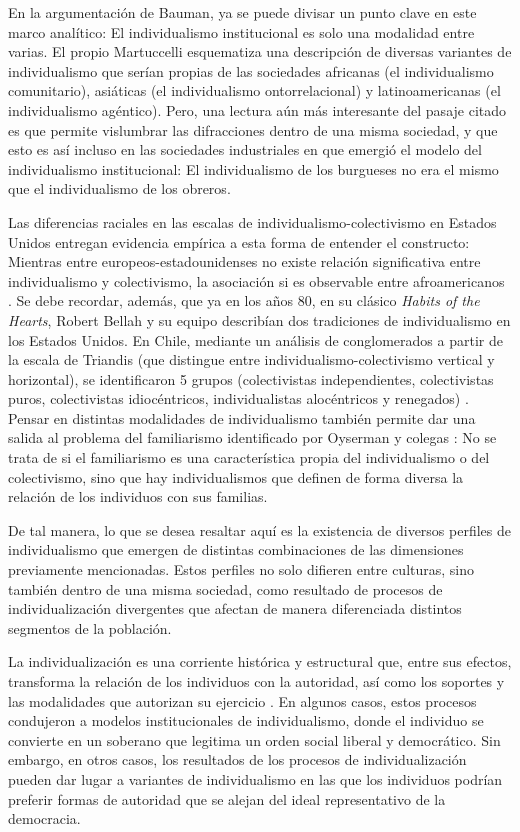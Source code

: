 \documentclass[12pt,twoside]{templates/facsothesis}
\begin{document}
En la argumentación de Bauman, ya se puede divisar un punto clave en este marco analítico: El individualismo institucional es solo una modalidad entre varias. El propio Martuccelli \citeyearpar{martuccelli2018} esquematiza una descripción de diversas variantes de individualismo que serían propias de las sociedades africanas (el individualismo comunitario), asiáticas (el individualismo ontorrelacional) y latinoamericanas (el individualismo agéntico). Pero, una lectura aún más interesante del pasaje citado es que permite vislumbrar las difracciones dentro de una misma sociedad, y que esto es así incluso en las sociedades industriales en que emergió el modelo del individualismo institucional: El individualismo de los burgueses no era el mismo que el individualismo de los obreros.

Las diferencias raciales en las escalas de individualismo-colectivismo en Estados Unidos \citep{oyserman2002, komarraju2008} entregan evidencia empírica a esta forma de entender el constructo: Mientras entre europeos-estadounidenses no existe relación significativa entre individualismo y colectivismo, la asociación si es observable entre afroamericanos \citep{komarraju2008}. Se debe recordar, además, que ya en los años 80, en su clásico \emph{Habits of the Hearts}, Robert Bellah y su equipo describían dos tradiciones de individualismo en los Estados Unidos. En Chile, mediante un análisis de conglomerados a partir de la escala de Triandis (que distingue entre individualismo-colectivismo vertical y horizontal), se identificaron 5 grupos (colectivistas independientes, colectivistas puros, colectivistas idiocéntricos, individualistas alocéntricos y renegados) \citep{rojas2008}. Pensar en distintas modalidades de individualismo también permite dar una salida al problema del familiarismo identificado por Oyserman y colegas \citeyearpar{oyserman2002}: No se trata de si el familiarismo es una característica propia del individualismo o del colectivismo, sino que hay individualismos que definen de forma diversa la relación de los individuos con sus familias.

De tal manera, lo que se desea resaltar aquí es la existencia de diversos perfiles de individualismo que emergen de distintas combinaciones de las dimensiones previamente mencionadas. Estos perfiles no solo difieren entre culturas, sino también dentro de una misma sociedad, como resultado de procesos de individualización divergentes que afectan de manera diferenciada distintos segmentos de la población.

La individualización es una corriente histórica y estructural que, entre sus efectos, transforma la relación de los individuos con la autoridad, así como los soportes y las modalidades que autorizan su ejercicio \citep{araujo2021}. En algunos casos, estos procesos condujeron a modelos institucionales de individualismo, donde el individuo se convierte en un soberano que legitima un orden social liberal y democrático. Sin embargo, en otros casos, los resultados de los procesos de individualización pueden dar lugar a variantes de individualismo en las que los individuos podrían preferir formas de autoridad que se alejan del ideal representativo de la democracia.
\end{document}
